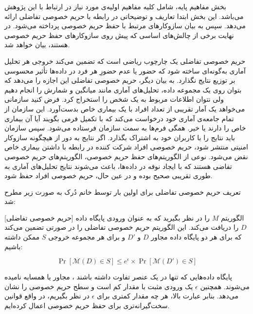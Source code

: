 

بخش مفاهیم پایه، شامل کلیه مفاهیم اولیه‌ی مورد نیاز در ارتباط با این پژوهش می‌باشد. این بخش ابتدا تعاریف و توضیحاتی در رابطه با حریم خصوصی تفاضلی ارائه می‌دهد. سپس به بیان سازوکار‌های مرتبط با حفظ حریم خصوصی پرداخته می‌شود. در نهایت برخی از چالش‌های اساسی که پیش روی سازوکارهای حفظ حریم خصوصی هستند، بیان خواهد شد.  


حریم خصوصی تفاضلی یک چارچوب ریاضی است که تضمین می‌کند خروجی هر تحلیل آماری به‌گونه‌ای ساخته شود که حضور یا عدم حضورِ هر فرد در داده‌ها تأثیر محسوسی بر توزیع نتایج نگذارد. به بیان دیگر، حریم خصوصی تفاضلی این اجازه را می‌دهد که بتوان روی یک مجموعه داده، تحلیل‌های آماری مانند میانگین و شمارش را انجام دهیم ولی نتوان اطلاعات مربوط به یک شخص را استخراج کرد.
فرض کنید سازمانی می‌خواهد یک آمار تقریبی از تعداد افراد با یک بیماری خاص بدست‌آورد. این سازمان از تمام جامعه‌ی آماری خود درخواست می‌کند که با تکمیل فرمی بگویند آیا آن بیماری خاص را دارند یا خیر. همگی فرم‌ها به سمت سازمان فرستاده می‌شود. سپس سازمان باید نتایج را با کاربران خود به اشتراک بگذارد. اگر نتایج به دور از هیچگونه سازوکار امنیتی منتشر شود، حریم خصوصی افراد شرکت کننده در رابطه با داشتن بیماری خاص نقض می‌شود. نوعی از الگوریتم‌های حفظ حریم خصوصی، الگوریتم‌های حریم خصوصی تفاضی هستند که با ایجاد نوفه در داده‌ها، باعث می‌شوند  نتایج تحلیل‌های آماری به طوری تقریبی صحیح بوده و در عین حال، حریم خصوصی افراد حفظ شود.

تعریف حریم خصوصی تفاضلی برای اولین بار توسط خانم دُرک  به صورت زیر مطرح شد:

[حریم خصوصی تفاضلی]
الگوریتم $M$ را در نظر بگیرید که به عنوان ورودی پایگاه داده $D$ را دریافت می‌کند. این الگوریتم حریم خصوصی تفاضلی را در صورتی تضمین می‌کند که برای هر دو پایگاه داده مجاور $D$ و $D'$ و برای هر مجموعه خروجی $S$ ممکن داشته باشیم:

\begin{equation}
\Pr[\mathcal{M}(D) \in S] \leq e^\epsilon \times \Pr[\mathcal{M}(D') \in S]
\end{equation}


پایگاه داده‌هایی که تنها در یک عنصر تفاوت داشته باشند ، مجاور یا همسایه نامیده می‌شوند. همچنین $\epsilon$ یک ورودی مثبت با مقدار کم است و سطح حریم خصوصی را نشان می‌دهد. بنابر عبارت بالا، هر چه مقدار کمتری برای  $\epsilon$ در نظر بگیریم، در واقع قوانین سخت‌گیرانه‌تری برای حفظ حریم خصوصی اعمال کرده‌ایم.

